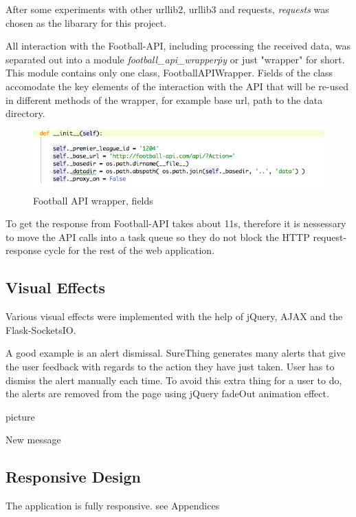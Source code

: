 After some experiments with other urllib2, urllib3 and requests, \emph{requests} was chosen as the libarary for this project.
		
All interaction with the Football-API, including processing the received data, was separated out into a module \emph{football\_api\_wrapper\.py} or just "wrapper" for short. This module contains only one class, FootballAPIWrapper. Fields of the class accomodate the key elements of the interaction with the API that will be re-used in different methods of the wrapper, for example base url, path to the data directory.
	
\begin{figure}[H]
\begin{center}
\includegraphics[width=.90\linewidth,natwidth=610,natheight=642]{impl/images/footballApiWrapperFields}
\caption{Football API wrapper, fields} \label{fig:using:footballapiwrapperfields}
\end{center}
\end{figure}
	
To get the response from Football-API takes about 11s, therefore it is nessessary to move the API calls into a task queue so they do not block the HTTP request-response cycle for the rest of the web application.

\subsection{Visual Effects}
Various visual effects were implemented with the help of jQuery, AJAX and the Flask-SocketsIO. 

A good example is an alert dismissal. SureThing generates many alerts that give the user feedback with regards to the action they have just taken. User has to dismiss the alert manually each time. To avoid this extra thing for a user to do, the alerts are removed from the page using jQuery fadeOut animation effect.

picture

New message


\subsection{Responsive Design}
The application is fully responsive. 
see Appendices


